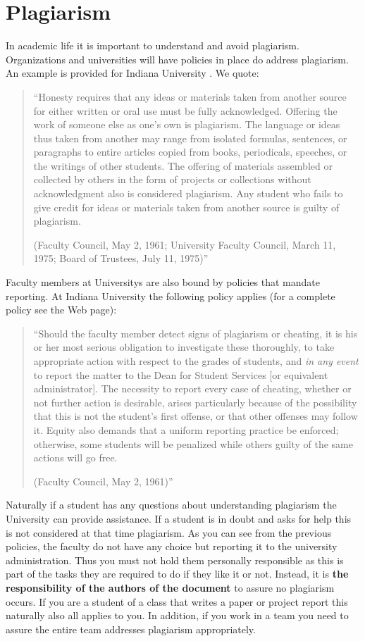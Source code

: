 \section{Plagiarism}

In academic life it is important to understand and avoid plagiarism.
Organizations and universities will have policies in place do address
plagiarism. An example is provided for Indiana University
\cite{www-iu-plagiarism}. We quote:

\begin{quotation}
``Honesty requires that any ideas or materials taken from
another source for either written or oral use must be fully
acknowledged. Offering the work of someone else as one’s own is
plagiarism. The language or ideas thus taken from another may range
from isolated formulas, sentences, or paragraphs to entire articles
copied from books, periodicals, speeches, or the writings of other
students. The offering of materials assembled or collected by others
in the form of projects or collections without acknowledgment also is
considered plagiarism. Any student who fails to give credit for ideas
or materials taken from another source is guilty of plagiarism. 

(Faculty Council, May 2, 1961; University Faculty Council, March 11,
1975; Board of Trustees, July 11, 1975)''
\end{quotation}

Faculty members at Universitys are also bound by policies that mandate
reporting. At Indiana University the following policy applies (for a
complete policy see the Web page):

\begin{quotation}
``Should
the faculty member detect signs of plagiarism or cheating, it is his
or her most serious obligation to investigate these thoroughly, to
take appropriate action with respect to the grades of students, and
{\em in any event} to report the matter to the Dean for Student Services [or
equivalent administrator]. The necessity to report every case of
cheating, whether or not further action is desirable, arises
particularly because of the possibility that this is not the student’s
first offense, or that other offenses may follow it. Equity also
demands that a uniform reporting practice be enforced; otherwise, some
students will be penalized while others guilty of the same actions
will go free.

(Faculty Council, May 2, 1961)''
\end{quotation}

Naturally if a student has any questions about understanding
plagiarism the University can provide assistance. If a student is in
doubt and asks for help this is not considered at that time
plagiarism. As you can see from the previous policies, the faculty do
not have any choice but reporting it to the university administration.
Thus you must not hold them personally responsible as this is part of
the tasks they are required to do if they like it or not. Instead, it
is {\bf the responsibility of the authors of the
  document} to assure no plagiarism occurs. If you are a student of
a class that writes a paper or project report this naturally also all
applies to you. In addition, if you work in a team you need to assure
the entire team addresses plagiarism appropriately.
